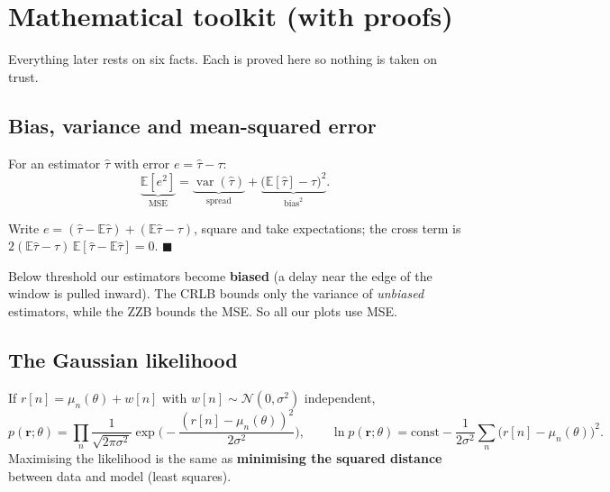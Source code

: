 \documentclass[11pt,a4paper]{article}
\newcommand{\E}{\mathbb{E}}
\newcommand{\var}{\operatorname{var}}
\newcommand{\br}{\mathbf{r}}
\begin{document}
\section{Mathematical toolkit (with proofs)}\label{sec:toolkit}
Everything later rests on six facts. Each is proved here so nothing is taken on trust.

\subsection{Bias, variance and mean-squared error}\label{sec:bias}
For an estimator $\hat\tau$ with error $e=\hat\tau-\tau$:
\begin{equation}
  \underbrace{\E[e^2]}_{\text{MSE}} = \underbrace{\var(\hat\tau)}_{\text{spread}} + \underbrace{\big(\E[\hat\tau]-\tau\big)^2}_{\text{bias}^2}.
\end{equation}
\begin{proofbox}
Write $e=(\hat\tau-\E\hat\tau)+(\E\hat\tau-\tau)$, square and take expectations; the cross term is
$2(\E\hat\tau-\tau)\,\E[\hat\tau-\E\hat\tau]=0$. \hfill$\blacksquare$
\end{proofbox}
\begin{whybox}
Below threshold our estimators become \textbf{biased} (a delay near the edge of the window is pulled inward). The CRLB
bounds only the variance of \emph{unbiased} estimators, while the ZZB bounds the MSE. So all our plots use MSE.
\end{whybox}

\subsection{The Gaussian likelihood}
If $r[n]=\mu_n(\theta)+w[n]$ with $w[n]\sim\mathcal N(0,\sigma^2)$ independent,
\begin{equation}
p(\br;\theta)=\prod_n\frac{1}{\sqrt{2\pi\sigma^2}}\exp\!\Big(-\frac{(r[n]-\mu_n(\theta))^2}{2\sigma^2}\Big),\qquad
\ln p(\br;\theta)=\text{const}-\frac{1}{2\sigma^2}\sum_n\big(r[n]-\mu_n(\theta)\big)^2 .
\end{equation}
Maximising the likelihood is the same as \textbf{minimising the squared distance} between data and model (least squares).
\end{document}
